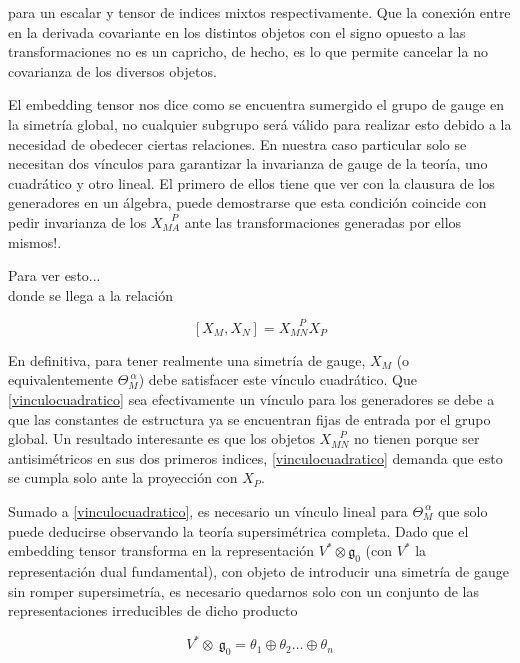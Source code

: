 \documentclass{article}
\numberwithin{equation}{section}
\begin{document}
para un escalar y tensor de indices mixtos respectivamente. Que la conexión entre en la derivada covariante en los distintos objetos con el signo opuesto a las transformaciones no es un capricho, de hecho, es lo que permite cancelar la no covarianza de los diversos objetos. 


El embedding tensor nos dice como se encuentra sumergido el grupo de gauge en la simetría global, no cualquier subgrupo será válido para realizar esto debido a la necesidad de obedecer ciertas relaciones. En nuestra caso particular solo se necesitan dos vínculos para garantizar la invarianza de gauge de la teoría, uno cuadrático y otro lineal. El primero de ellos tiene que ver con la clausura de los generadores en un álgebra, puede demostrarse que esta condición coincide con pedir invarianza de los $X_{M A}^{\ \ \ \ P} $ ante las transformaciones generadas por ellos mismos!.

Para ver esto...\\

donde se llega a la relación 

\begin{equation}\label{vinculocuadratico}
\left[X_M, X_N\right] = X_{M N}^{\ \ \ \ P} X_P
\end{equation}


En definitiva, para tener realmente una simetría de gauge, $ X_M $ (o equivalentemente $ \Theta_M^{\ \alpha} $) debe satisfacer este vínculo cuadrático. Que \ref{vinculocuadratico} sea efectivamente un vínculo para los generadores se debe a que las constantes de estructura ya se encuentran fijas de entrada por el grupo global. Un resultado interesante es que los objetos $ X_{M N}^{\ \ \ \ P} $ no tienen porque ser antisimétricos en sus dos primeros indices, \ref{vinculocuadratico} demanda que esto se cumpla solo ante la proyección con $ X_P $.

Sumado a \ref{vinculocuadratico}, es necesario un vínculo lineal para $ \Theta_M^{\ \alpha} $ que solo puede deducirse observando la teoría supersimétrica completa. Dado que el embedding tensor transforma en la representación $ V^{*} \otimes \mathfrak{g}_0 $  (con $ V^{*} $ la representación dual fundamental), con objeto de introducir una simetría de gauge sin romper supersimetría, es necesario quedarnos solo con un conjunto de las representaciones irreducibles de dicho producto

\begin{equation}
V^{*} \otimes \ \mathfrak{g}_0 = \theta_1 \oplus \theta_2 \dots \oplus \theta_n
\end{equation}
\end{document}
